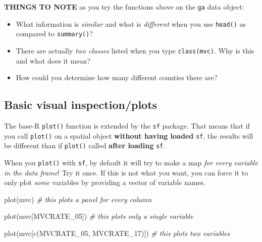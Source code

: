 \documentclass[
]{book}
\newenvironment{Shaded}{\begin{snugshade}}{\end{snugshade}}
\newcommand{\CommentTok}[1]{\textcolor[rgb]{0.56,0.35,0.01}{\textit{#1}}}
\newcommand{\FunctionTok}[1]{\textcolor[rgb]{0.00,0.00,0.00}{#1}}
\newcommand{\NormalTok}[1]{#1}
\newcommand{\StringTok}[1]{\textcolor[rgb]{0.31,0.60,0.02}{#1}}
\providecommand{\tightlist}{%
  \setlength{\itemsep}{0pt}\setlength{\parskip}{0pt}}
\newenvironment{rmdnote}[1]
  {
  \begin{itemize}
  \renewcommand{\labelitemi}{
    \raisebox{-.7\height}[0pt][0pt]{
      {\setkeys{Gin}{width=3em,keepaspectratio}\texttt{[image: images/\#1]}}
    }
  }
  \setlength{\fboxsep}{1em}
  \begin{note}
  \item
  }
  {
  \end{note}
  \end{itemize}
  }
\begin{document}
\begin{rmdnote}{note}

\textbf{THINGS TO NOTE} as you try the functions above on the \texttt{ga} data object:

\begin{itemize}
\tightlist
\item
  What information is \emph{similar} and what is \emph{different} when you use \texttt{head()} as compared to \texttt{summary()}?
\item
  There are actually \emph{two classes} listed when you type \texttt{class(mvc)}. Why is this and what does it mean?
\item
  How could you determine how many different counties there are?
\end{itemize}

\end{rmdnote}

\hypertarget{basic-visual-inspectionplots-1}{%
\subsection{Basic visual inspection/plots}\label{basic-visual-inspectionplots-1}}

The base-R \texttt{plot()} function is extended by the \texttt{sf} package. That means that if you call \texttt{plot()} on a spatial object \textbf{without having loaded} \texttt{sf}, the results will be different than if \texttt{plot()} called \textbf{after loading} \texttt{sf}.

When you \texttt{plot()} with \texttt{sf}, by default it will try to make a map \emph{for every variable in the data frame}! Try it once. If this is not what you want, you can force it to only plot \emph{some} variables by providing a vector of variable names.

\begin{Shaded}
\begin{Highlighting}[]
\FunctionTok{plot}\NormalTok{(mvc) }\CommentTok{\# this plots a panel for every column}

\FunctionTok{plot}\NormalTok{(mvc[}\StringTok{\textquotesingle{}MVCRATE\_05\textquotesingle{}}\NormalTok{]) }\CommentTok{\# this plots only a single variable}

\FunctionTok{plot}\NormalTok{(mvc[}\FunctionTok{c}\NormalTok{(}\StringTok{\textquotesingle{}MVCRATE\_05\textquotesingle{}}\NormalTok{, }\StringTok{\textquotesingle{}MVCRATE\_17\textquotesingle{}}\NormalTok{)]) }\CommentTok{\# this plots two variables}
\end{Highlighting}
\end{Shaded}
\end{document}
